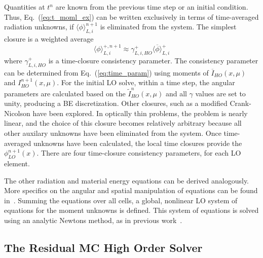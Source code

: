 \documentclass{anstrans}
\renewcommand{\eqref}[1]{(\ref{#1})}
\newcommand{\mom}[1]{\langle #1 \rangle}
\begin{document}
Quantities at $t^{n}$ are known from the previous time step or an initial condition.  
Thus, Eq.~\eqref{eq:t_moml_ex} can be written exclusively in terms
of time-averaged radiation unknowns, if $\mom{\phi}_{L,i}^{n+1}$ is eliminated from the
system.  The simplest closure is a weighted average
\begin{equation}\label{eq:time_param}
    \mom{\phi}_{L,i}^{+,n+1} \approx \gamma_{L,i,HO}^+ \mom{\overline{\phi}}_{L,i}^+
\end{equation}
where $\gamma_{L,i,HO}^+$ is a time-closure consistency parameter.  The consistency
parameter can be determined from Eq.~\eqref{eq:time_param} using moments of $\overline{I}_{HO}(x,\mu)$ and
$I^{n+1}_{HO}(x,\mu)$. For the initial LO solve, within a time step, the angular parameters
are calculated based on the $\tilde I_{HO}^n(x,\mu)$ and all $\gamma$ values are set to unity, producing a BE discretization.
Other closures, such as a modified Crank-Nicolson have been explored.  In optically
thin problems, the problem is nearly linear, and the choice of this closure becomes
relatively arbitrary because all other auxilary unknowns have been eliminated from the system.
Once time-averaged unknowns have been calculated, the local time closures provide the $\phi_{LO}^{n+1}(x)$.  There are four time-closure consistency parameters, for each LO element. 

The other radiation and material energy equations can be derived analogously.  More specifics on the angular and spatial
manipulation of equations can be found in~\cite{bolding_nse}.  
Summing the equations over all cells, a global, nonlinear LO system of equations for the
moment unknowns is defined.  This system of equations is solved using an analytic Newtons method, as in
previous work~\cite{bolding_nse}. 


\subsection*{The Residual MC High Order Solver}
\label{sec:ho}
\end{document}
